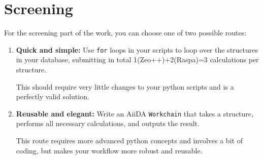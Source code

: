 \documentclass[twoside,a4paper,11pt]{extarticle}
\begin{document}
\section{Screening}

For the screening part of the work, you can choose one of two possible routes:

\begin{enumerate}
    \item \textbf{Quick and simple:} Use \verb|for| loops in your scripts to loop over the structures in your database, 
    submitting in total 1(Zeo++)+2(Raspa)=3 calculations per structure.
    
    This should require very little changes to your python scripts
    and is a perfectly valid solution.
    \item \textbf{Reusable and elegant:} Write an AiiDA \verb|Workchain| that takes a structure, performs all necessary calculations, and outputs the result.
    
    This route requires more advanced python concepts and
    involves a bit of coding,
    but makes your workflow more robust and reusable.
\end{enumerate}


%
%
%
%
%
%
%
%
%
\end{document}
